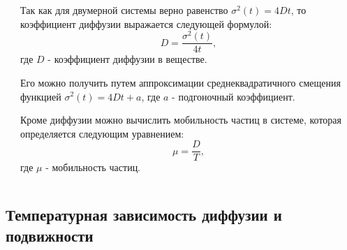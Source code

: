 \documentclass[pdf,hyperref={unicode}]{beamer}
\begin{document}
\begin{frame}
\begin{columns}
\begin{column}{0.6\linewidth}
\end{column}
\begin{column}{0.5\linewidth}
\tiny{

Так как для двумерной системы верно равенство $\sigma^2(t) = 4Dt$, то коэффициент диффузии выражается следующей формулой:
\begin{equation}
    D = \frac{\sigma^2(t)}{4t},
    \label{eqD}
\end{equation}
где $D$ - коэффициент диффузии в веществе.

Его можно получить путем аппроксимации среднеквадратичного смещения функцией $\sigma^2(t) = 4Dt + a$, где $a$ - подгоночный коэффициент.

Кроме диффузии можно вычислить мобильность частиц в системе, которая определяется следующим уравнением:
\begin{equation}
    \mu  = \frac{D}{T},
    \label{eqMuDiff}
\end{equation}
где $\mu$ - мобильность частиц.
}
\end{column}

\end{columns}
\end{frame}


\subsection{Температурная зависимость диффузии и подвижности}
\end{document}
